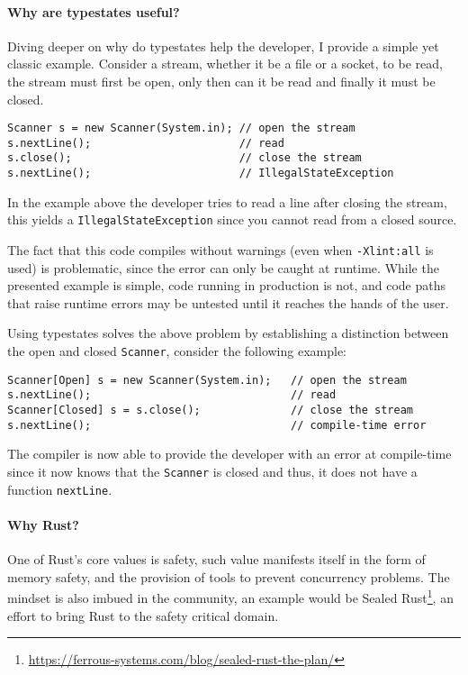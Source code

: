 \documentclass{article}
\begin{document}
\paragraph{Why are typestates useful?}

Diving deeper on why do typestates help the developer, I provide a simple yet classic example.
Consider a stream, whether it be a file or a socket, to be read, the stream must first be open,
only then can it be read and finally it must be closed.

\begin{verbatim}
Scanner s = new Scanner(System.in); // open the stream
s.nextLine();                       // read
s.close();                          // close the stream
s.nextLine();                       // IllegalStateException
\end{verbatim}

In the example above the developer tries to read a line after closing the stream,
this yields a \texttt{IllegalStateException} since you cannot read from a closed source.

The fact that this code compiles without warnings (even when \texttt{-Xlint:all} is used) is problematic,
since the error can only be caught at runtime.
While the presented example is simple,
code running in production is not,
and code paths that raise runtime errors may be untested until it reaches the hands of the user.

Using typestates solves the above problem by establishing a distinction between the open and closed \texttt{Scanner},
consider the following example:

\begin{verbatim}
Scanner[Open] s = new Scanner(System.in);   // open the stream
s.nextLine();                               // read
Scanner[Closed] s = s.close();              // close the stream
s.nextLine();                               // compile-time error
\end{verbatim}

The compiler is now able to provide the developer with an error at compile-time since it now knows that the \texttt{Scanner} is closed and thus,
it does not have a function \texttt{nextLine}.

\paragraph{Why Rust?}


One of Rust's core values is safety,
such value manifests itself in the form of memory safety,
and the provision of tools to prevent concurrency problems.
The mindset is also imbued in the community,
an example would be Sealed Rust\footnote{\url{https://ferrous-systems.com/blog/sealed-rust-the-plan/}},
an effort to bring Rust to the safety critical domain.
\end{document}
